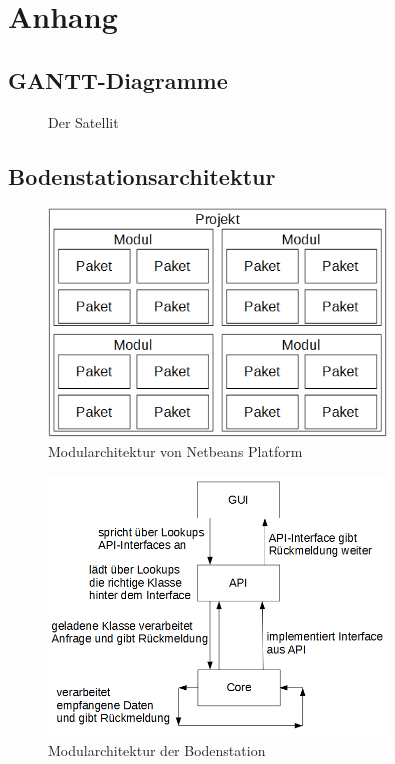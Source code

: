 \section{Anhang}

\subsection{GANTT-Diagramme}


\begin{figure}[h] 
      \centering 
      \caption{Der Satellit}\label{fig:hla} 
\end{figure} 

\subsection{Bodenstationsarchitektur}
\begin{figure}[h]
	\centering
	\includegraphics[width=0.8\textwidth]{3_Beschreibung_der_Bodenstation/NBP_Modularchitektur.png}
	\caption{Modularchitektur von Netbeans Platform}
	\label{nbp_modularchitektur}
\end{figure}

\begin{figure}[h]
	\centering
	\includegraphics[width=0.8\textwidth]{3_Beschreibung_der_Bodenstation/Bodenstation_Modularchitektur.png}
	\caption{Modularchitektur der Bodenstation}
	\label{station_modularchitektur}
\end{figure}
